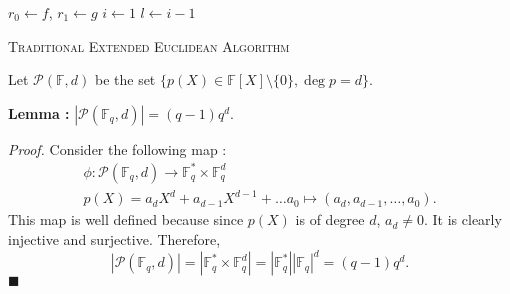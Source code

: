 \begin{thisnote}
\begin{center}
\begin{minipage}{.7\linewidth}
\begin{algorithm}[H]
    \SetAlgoLined

    $r_0\leftarrow f$, $r_1\leftarrow g$\;
    $i\leftarrow 1$\;
    $l\leftarrow i-1$\;
    \caption{\textsc{Traditional Extended Euclidean Algorithm}}
\end{algorithm}
\end{minipage}
\end{center}
\end{thisnote}
\begin{thisnote1}
Let $\mathscr{P}(\mathbb{F}, d)$ be the set $\{p(X) \in \mathbb{F}[X]\setminus\{0\} ,\deg{p}=d\}$.

\textbf{Lemma : } $|\mathscr{P}(\mathbb{F}_q, d)| = (q-1)q^d$.

\textit{Proof. } Consider the following map : 
\begin{gather*}
    \phi : \mathscr{P}(\mathbb{F}_q, d) \to \mathbb{F}_q^* \times \mathbb{F}_q^{d} \\
    p(X) = a_d X^d + a_{d-1}X^{d-1}+\ldots a_0 \mapsto (a_d, a_{d-1},\ldots, a_{0}).
\end{gather*}
This map is well defined because since $p(X)$ is of degree $d$, $a_d\neq 0$. It is clearly injective and surjective. Therefore, 
\[|\mathscr{P}(\mathbb{F}_q, d)| = |\mathbb{F}_q^*\times \mathbb{F}_q^d| = |\mathbb{F}_q^*||\mathbb{F}_q|^d = (q-1)q^d.\]
\hfill $\blacksquare$
\end{thisnote1}

